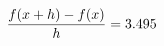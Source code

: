 \documentclass[preview]{standalone}
\begin{document}
\begin{align*}
\special{dvisvgm:raw <g id='unique000'>}\frac{f(x+h)-f(x)}{h} = 3.495\special{dvisvgm:raw </g>}
\end{align*}
\end{document}
